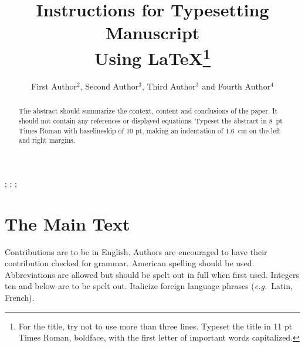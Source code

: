 \documentclass{ws-jai}
\begin{document}
\catchline{}{}{}{}{} %


\title{Instructions for Typesetting Manuscript\\
Using \LaTeX\footnote{For the title, try not to use more than
three lines. Typeset the title in 11 pt Times Roman,
boldface, with the first letter of important words capitalized.}}

\author{First Author$^{2}$, Second Author$^{3}$, Third Author$^{3}$ and Fourth Author$^{4}$}

\address{
$^{2}$Department, University Name, City, State ZIP/Zone, Country, fauthor@university.com\\
$^{3}$Group, Company, Address, City, State ZIP/Zone, Country\\
$^{4}$Group, Company, Address, City, State ZIP/Zone, Country, fauthor@company.com
}

\maketitle


\begin{history}
;
;
;
\end{history}

\begin{abstract}
The abstract should summarize the context, content and conclusions
of the paper. It should not contain any references or displayed
equations. Typeset the abstract in 8~pt Times Roman with
baselineskip of 10 pt, making an indentation of 1.6~cm on the left
and right margins.
\end{abstract}


\section{The Main Text}
\noindent Contributions are to be in English. Authors are
encouraged to have their contribution checked for grammar.
American spelling should be used. Abbreviations are allowed but
should be spelt out in full when first used. Integers ten and
below are to be spelt out. Italicize foreign language phrases
({\it e.g.}~Latin, French).
\end{document}

